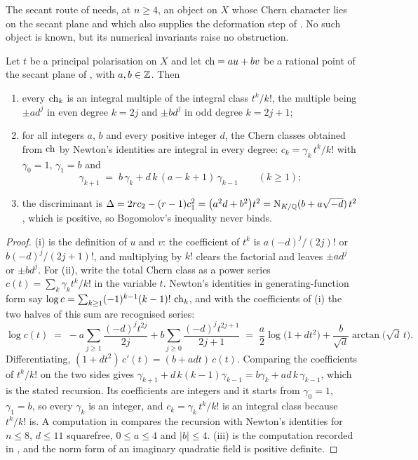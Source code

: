 The secant route of  needs, at $n\ge4$, an object on
$X$ whose Chern character lies on the secant plane and which also supplies the
deformation step of . No such object is known, but its
numerical invariants raise no obstruction.

\begin{proposition}%
\label{prop:notforbidden}
Let $t$ be a principal polarisation on $X$ and let
$\operatorname{ch}=au+bv$ be a rational point of the secant plane of ,
with $a,b\in\mathbb{Z}$. Then
\begin{enumerate}[label=\textup{(\roman*)},nosep]
\item every $\operatorname{ch}_{k}$ is an integral multiple of the integral class
  $t^{k}/k!$, the multiple being $\pm a d^{j}$ in even degree $k=2j$ and
  $\pm b d^{j}$ in odd degree $k=2j+1$;
\item for all integers $a$, $b$ and every positive integer $d$, the Chern
  classes obtained from $\operatorname{ch}$ by Newton's identities are integral in every
  degree: $c_{k}=\gamma_{k}\,t^{k}/k!$ with $\gamma_{0}=1$, $\gamma_{1}=b$ and
  \[
    \gamma_{k+1}\;=\;b\,\gamma_{k}+d\,k\,(a-k+1)\,\gamma_{k-1}\qquad(k\ge1);
  \]
\item the discriminant is
  $\Delta=2rc_{2}-(r-1)c_{1}^{2}=\bigl(a^{2}d+b^{2}\bigr)t^{2}
  =\mathrm{N}_{K/\mathbb{Q}}(b+a\sqrt{-d})\,t^{2}$, which is positive, so Bogomolov's
  inequality never binds.
\end{enumerate}
\end{proposition}

\begin{proof}
(i) is the definition of $u$ and $v$: the coefficient of $t^{k}$ is
$a(-d)^{j}/(2j)!$ or $b(-d)^{j}/(2j+1)!$, and multiplying by $k!$ clears the
factorial and leaves $\pm ad^{j}$ or $\pm bd^{j}$. For (ii), write the total
Chern class as a power series $c(t)=\sum_{k}\gamma_{k}t^{k}/k!$ in the
variable $t$. Newton's identities in generating-function form say
$\log c=\sum_{k\ge1}(-1)^{k-1}(k-1)!\,\operatorname{ch}_{k}$, and with the coefficients of
(i) the two halves of this sum are recognised series:
\[
  \log c(t)\;=\;-a\sum_{j\ge1}\frac{(-d)^{j}t^{2j}}{2j}
     +b\sum_{j\ge0}\frac{(-d)^{j}t^{2j+1}}{2j+1}
  \;=\;\frac{a}{2}\log\bigl(1+dt^{2}\bigr)
     +\frac{b}{\sqrt{d}}\arctan\bigl(\sqrt{d}\,t\bigr).
\]
Differentiating, $(1+dt^{2})\,c'(t)=(b+adt)\,c(t)$. Comparing the
coefficients of $t^{k}/k!$ on the two sides gives
$\gamma_{k+1}+d\,k(k-1)\gamma_{k-1}=b\gamma_{k}+ad\,k\,\gamma_{k-1}$, which is
the stated recursion. Its coefficients are integers and it starts from
$\gamma_{0}=1$, $\gamma_{1}=b$, so every $\gamma_{k}$ is an integer, and
$c_{k}=\gamma_{k}\,t^{k}/k!$ is an integral class because $t^{k}/k!$ is. A
computation in \cite{BMB26} compares the recursion with Newton's identities
for $n\le8$, $d\le11$ squarefree, $0\le a\le4$ and $|b|\le4$. (iii) is the computation recorded in
, and the norm form of an imaginary quadratic field
is positive definite.
\end{proof}

